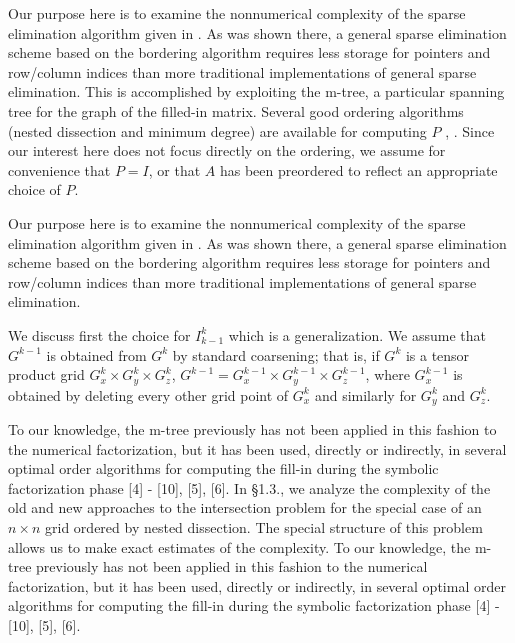 \documentclass[twoside,leqno,twocolumn]{article}
\begin{document}
Our purpose here is to examine the nonnumerical complexity of the
sparse elimination algorithm given in  \cite{BANKSMITH}.
As was shown there, a general sparse elimination scheme based on the
bordering algorithm requires less storage for pointers and
row/column indices than more traditional implementations of general
sparse elimination.  This is accomplished by exploiting the m-tree,
a particular spanning tree for the graph of the filled-in matrix.
Several good ordering algorithms (nested dissection and minimum degree)
are available for computing $P$  \cite{GEORGELIU}, \cite{ROSE72}.
Since our interest here does not
focus directly on the ordering, we assume for convenience that $P=I$,
or that $A$ has been preordered to reflect an appropriate choice of $P$.

Our purpose here is to examine the nonnumerical complexity of the
sparse elimination algorithm given in  \cite{BANKSMITH}.
As was shown there, a general sparse elimination scheme based on the
bordering algorithm requires less storage for pointers and
row/column indices than more traditional implementations of general
sparse elimination.

\begin{lemma} We discuss first the choice for $I_{k-1}^k$
which is a generalization. We assume that $G^{k-1}$ is
obtained
from $G^k$
by standard coarsening; that is, if $G^k$ is a tensor product
grid $G_{x}^k \times G_{y}^k \times G_{z}^k$,
$G^{k-1}=G_{x}^{k-1} \times G_{y}^{k-1} \times G_{z}^{k-1}$,
where $G_{x}^{k-1}$ is obtained by deleting every other grid
point of $G_x^k$ and similarly for $G_{y}^k$ and $G_{z}^k$.
\end{lemma}

To our knowledge, the m-tree previously has not been applied in this
fashion to the numerical factorization, but it has been used,
directly or indirectly, in several optimal order algorithms for
computing the fill-in during the symbolic factorization phase
[4] - [10], [5], [6]. In \S 1.3., we analyze the complexity of the old and new
approaches to the intersection problem for the special case of
an $n \times n$ grid ordered by nested dissection. The special
structure of this problem allows us to make exact estimates of
the complexity. To our knowledge, the m-tree previously has not been applied in this
fashion to the numerical factorization, but it has been used,
directly or indirectly, in several optimal order algorithms for
computing the fill-in during the symbolic factorization phase
[4] - [10], [5], [6].
\end{document}
